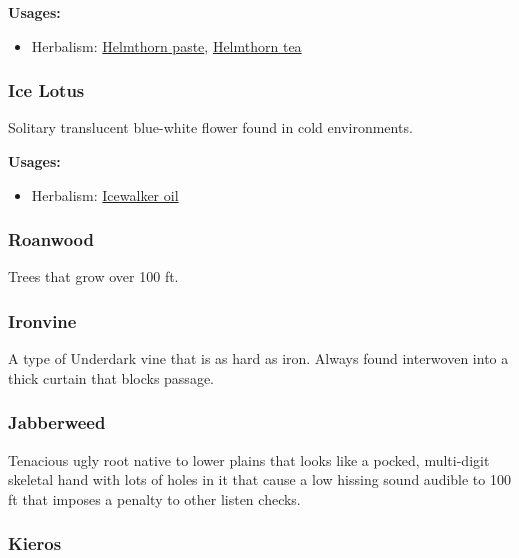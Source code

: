 \vspace{5mm}

\textbf{Usages:}

\begin{itemize}[noitemsep]
\item[] Herbalism: \hyperref[Helmthorn paste]{Helmthorn paste}, \hyperref[Helmthorn tea]{Helmthorn tea}
\end{itemize}

\subsubsection{Ice Lotus}
\label{Ice Lotus}

Solitary translucent blue-white flower found in cold environments.

\vspace{5mm}

\textbf{Usages:}

\begin{itemize}[noitemsep]
\item[] Herbalism: \hyperref[Icewalker oil]{Icewalker oil}
\end{itemize}

\subsubsection{Roanwood}

Trees that grow over 100 ft.

\subsubsection{Ironvine}

A type of Underdark vine that is as hard as iron. Always found interwoven into a thick curtain that blocks passage.

\subsubsection{Jabberweed}

Tenacious ugly root native to lower plains that looks like a pocked, multi-digit skeletal hand with lots of holes in it that cause a low hissing sound audible to 100 ft that imposes a penalty to other listen checks. 

\subsubsection{Kieros}
\label{Kieros}

